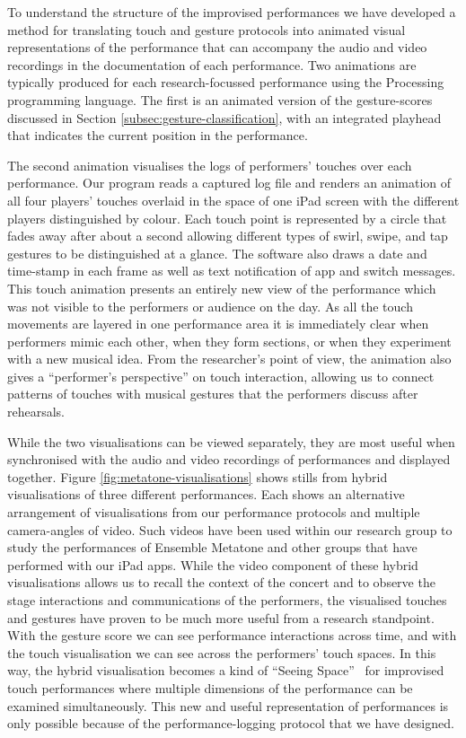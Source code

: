 \documentclass[graybox]{svmult}
\begin{document}
To understand the structure of the improvised performances we have
developed a method for translating touch and gesture protocols into
animated visual representations of the performance that can accompany
the audio and video recordings in the documentation of each
performance. Two animations are typically produced for each
research-focussed performance using the 
Processing~\cite{Reas:2006kq} programming language.
The first is an animated version of the gesture-scores
discussed in Section \ref{subsec:gesture-classification}, with an
integrated playhead that indicates the current position in the
performance. 

The second animation visualises the logs of performers'
touches over each performance. Our program reads a captured log file
and renders an animation of all four players' touches overlaid in the
space of one iPad screen with the different players distinguished by
colour. Each touch point is represented by a circle that fades away
after about a second allowing different types of swirl, swipe, and tap
gestures to be distinguished at a glance. The software also draws a
date and time-stamp in each frame as well as text notification of app
and switch messages.
This touch animation presents an entirely new view of the
performance which was not visible to the performers or audience on the
day. As all the touch movements are layered in one performance area it
is immediately clear when performers mimic each other, when they form sections,
or when they experiment with a new musical idea. From the researcher's point of
view, the animation also gives a ``performer's perspective'' on touch
interaction, allowing us to connect patterns of touches with musical
gestures that the performers discuss after rehearsals.

While the two visualisations can be viewed separately, they are most
useful when synchronised with the audio and video recordings of
performances and displayed together. Figure
\ref{fig:metatone-visualisations} shows stills from hybrid
visualisations of three different performances. Each shows an
alternative arrangement of visualisations from our performance
protocols and multiple camera-angles of video. Such videos have been
used within our research group to study the performances of Ensemble
Metatone and other groups that have performed with our iPad apps.
While the video component of these hybrid visualisations allows us to
recall the context of the concert and to observe the stage
interactions and communications of the performers, the visualised
touches and gestures have proven to be much more useful from a
research standpoint. With the gesture score we can see performance
interactions across time, and with the touch visualisation we can see
across the performers' touch spaces. In this way, the hybrid
visualisation becomes a kind of ``Seeing Space''~\cite{Victor:2014sf}
for improvised touch performances where multiple dimensions of the
performance can be examined simultaneously. This new and useful
representation of performances is only possible because of the
performance-logging protocol that we have designed.
\end{document}
